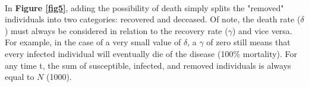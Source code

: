 \documentclass{article}
\begin{document}
\paragraph{}
In \textbf{Figure \ref{fig5}}, adding the possibility of death simply splits the "removed" individuals into two categories: recovered and deceased. Of note, the death rate ($\delta$) must always be considered in relation to the recovery rate ($\gamma$) and vice versa. For example, in the case of a very small value of $\delta$, a $\gamma$ of zero still means that every infected individual will eventually die of the disease (100\% mortality). For any time t, the sum of susceptible, infected, and removed individuals is always equal to $N$ (1000).
\end{document}
